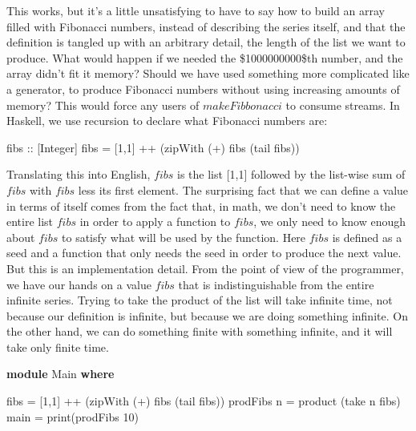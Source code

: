 \documentclass[]{article}
\newenvironment{Shaded}{}{}
\newcommand{\KeywordTok}[1]{\textcolor[rgb]{0.00,0.44,0.13}{\textbf{{#1}}}}
\newcommand{\DataTypeTok}[1]{\textcolor[rgb]{0.56,0.13,0.00}{{#1}}}
\newcommand{\DecValTok}[1]{\textcolor[rgb]{0.25,0.63,0.44}{{#1}}}
\newcommand{\OtherTok}[1]{\textcolor[rgb]{0.00,0.44,0.13}{{#1}}}
\newcommand{\FunctionTok}[1]{\textcolor[rgb]{0.02,0.16,0.49}{{#1}}}
\newcommand{\NormalTok}[1]{{#1}}
\begin{document}
\doublespacing

This works, but it's a little unsatisfying to have to say how to build
an array filled with Fibonacci numbers, instead of describing the series
itself, and that the definition is tangled up with an arbitrary detail,
the length of the list we want to produce. What would happen if we
needed the \$1000000000\$th number, and the array didn't fit it memory?
Should we have used something more complicated like a generator, to
produce Fibonacci numbers without using increasing amounts of memory?
This would force any users of \(makeFibbonacci\) to consume streams. In
Haskell, we use recursion to declare what Fibonacci numbers are:

\singlespacing

\begin{Shaded}
\begin{Highlighting}[]
\OtherTok{fibs ::} \NormalTok{[}\DataTypeTok{Integer}\NormalTok{]}
\NormalTok{fibs }\FunctionTok{=} \NormalTok{[}\DecValTok{1}\NormalTok{,}\DecValTok{1}\NormalTok{] }\FunctionTok{++} \NormalTok{(zipWith (}\FunctionTok{+}\NormalTok{) fibs (tail fibs))}
\end{Highlighting}
\end{Shaded}

\doublespacing

Translating this into English, \(fibs\) is the list {[}1,1{]} followed
by the list-wise sum of \(fibs\) with \(fibs\) less its first element.
The surprising fact that we can define a value in terms of itself comes
from the fact that, in math, we don't need to know the entire list
\(fibs\) in order to apply a function to \(fibs\), we only need to know
enough about \(fibs\) to satisfy what will be used by the function. Here
\(fibs\) is defined as a seed and a function that only needs the seed in
order to produce the next value. But this is an implementation detail.
From the point of view of the programmer, we have our hands on a value
\(fibs\) that is indistinguishable from the entire infinite series.
Trying to take the product of the list will take infinite time, not
because our definition is infinite, but because we are doing something
infinite. On the other hand, we can do something finite with something
infinite, and it will take only finite time.

\singlespacing

\begin{Shaded}
\begin{Highlighting}[]
\KeywordTok{module} \DataTypeTok{Main} \KeywordTok{where}

\NormalTok{fibs }\FunctionTok{=} \NormalTok{[}\DecValTok{1}\NormalTok{,}\DecValTok{1}\NormalTok{] }\FunctionTok{++} \NormalTok{(zipWith (}\FunctionTok{+}\NormalTok{) fibs (tail fibs))}
\NormalTok{prodFibs n }\FunctionTok{=} \NormalTok{product (take n fibs)}
\NormalTok{main }\FunctionTok{=} \NormalTok{print(prodFibs }\DecValTok{10}\NormalTok{)}
\end{Highlighting}
\end{Shaded}
\end{document}
